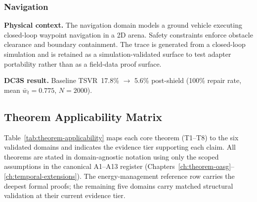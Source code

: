 \subsubsection{Navigation}
\label{sec:profile-navigation}

\textbf{Physical context.}
The navigation domain models a ground vehicle executing closed-loop
waypoint navigation in a 2D arena.  Safety constraints enforce obstacle
clearance and boundary containment.  The trace is generated from a
closed-loop simulation and is retained as a simulation-validated surface
to test adapter portability rather than as a field-data proof surface.

\textbf{DC3S result.}
Baseline TSVR~17.8\% $\rightarrow$ 5.6\% post-shield (100\% repair rate,
mean $\bar{w}_t = 0.775$, $N = 2000$).

\subsection{Theorem Applicability Matrix}
\label{sec:theorem-applicability}

Table~\ref{tab:theorem-applicability} maps each core theorem (T1--T8)
to the six validated domains and indicates the evidence tier supporting
each claim.  All theorems are stated in domain-agnostic notation using
only the scoped assumptions in the canonical A1--A13 register
(Chapters~\ref{ch:theorem-oasg}--\ref{ch:temporal-extensions}).
The energy-management reference row carries the deepest formal proofs; the
remaining five domains carry matched structural validation at their current
evidence tier.

